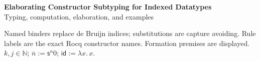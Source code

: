 \documentclass[10pt,a4paper]{article}
\newcommand{\op}[1]{\mathsf{#1}}
\newcommand{\id}{\op{id}}
\newcommand{\pos}[1]{\overline{#1}}
\begin{document}
\begin{center}
{\Large\bfseries Elaborating Constructor Subtyping for Indexed Datatypes}\\[3pt]
Typing, computation, elaboration, and examples
\end{center}
Named binders replace de Bruijn indices; substitutions are capture avoiding.
Rule labels are the exact Rocq constructor names. Formation premises are
displayed. $k,j\in\mathbb N$; $\pos{n}:=\op{s}^{n}0$;
$\id:=\lambda x.\,x$.





\end{document}
